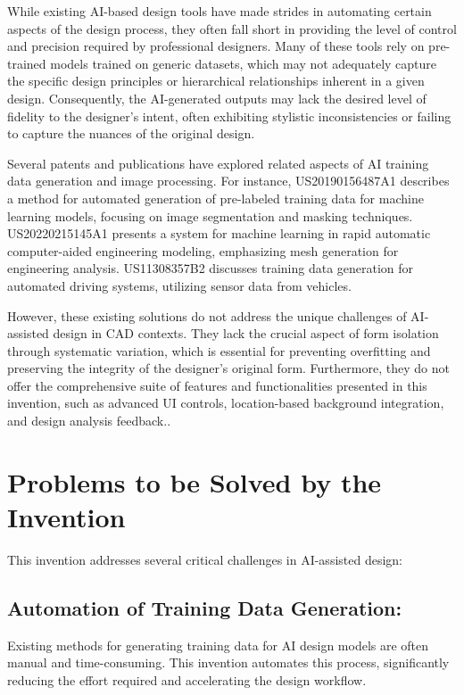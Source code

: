 \documentclass{article}
\begin{document}
While existing AI-based design tools have made strides in automating certain aspects of the design process, they often fall short in providing the level of control and precision required by professional designers. Many of these tools rely on pre-trained models trained on generic datasets, which may not adequately capture the specific design principles or hierarchical relationships inherent in a given design. Consequently, the AI-generated outputs may lack the desired level of fidelity to the designer's intent, often exhibiting stylistic inconsistencies or failing to capture the nuances of the original design.

Several patents and publications have explored related aspects of AI training data generation and image processing. For instance, US20190156487A1 describes a method for automated generation of pre-labeled training data for machine learning models, focusing on image segmentation and masking techniques. US20220215145A1 presents a system for machine learning in rapid automatic computer-aided engineering modeling, emphasizing mesh generation for engineering analysis. US11308357B2 discusses training data generation for automated driving systems, utilizing sensor data from vehicles.

However, these existing solutions do not address the unique challenges of AI-assisted design in CAD contexts. They lack the crucial aspect of form isolation through systematic variation, which is essential for preventing overfitting and preserving the integrity of the designer's original form. Furthermore, they do not offer the comprehensive suite of features and functionalities presented in this invention, such as advanced UI controls, location-based background integration, and design analysis feedback..

\section{Problems to be Solved by the Invention}

This invention addresses several critical challenges in AI-assisted design:

\subsection{Automation of Training Data Generation:}
Existing methods for generating training data for AI design models are often manual and time-consuming. This invention automates this process, significantly reducing the effort required and accelerating the design workflow.
\end{document}
